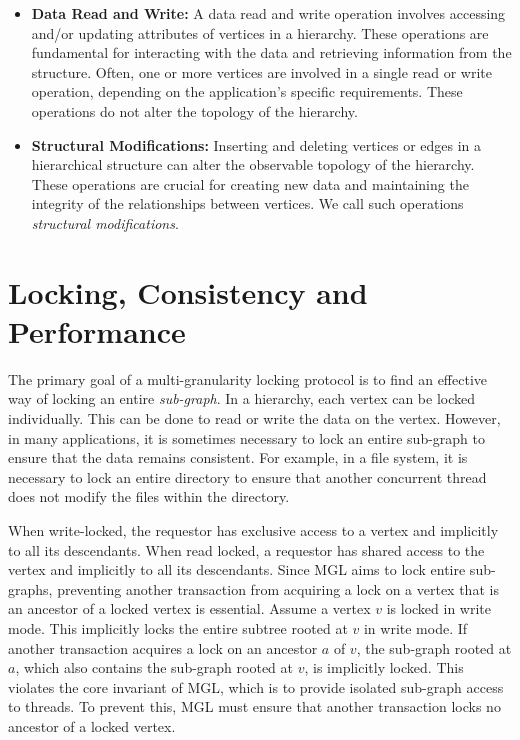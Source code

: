 \begin{itemize}

    
    \item \textbf{Data Read and Write:} A data read and write operation involves accessing and/or updating attributes of vertices in a hierarchy. These operations are fundamental for interacting with the data and retrieving information from the structure. Often, one or more vertices are involved in a single read or write operation, depending on the application's specific requirements. These operations do not alter the topology of the hierarchy.

    \item \textbf{Structural Modifications:} Inserting and deleting vertices or edges in a hierarchical structure can alter the observable topology of the hierarchy. These operations are crucial for creating new data and maintaining the integrity of the relationships between vertices. We call such operations \emph{structural modifications}.
    

\end{itemize}

\section{Locking, Consistency and Performance}
The primary goal of a multi-granularity locking protocol is to find an effective way of locking an entire \emph{sub-graph}. In a hierarchy, each vertex can be locked individually. This can be done to read or write the data on the vertex. However, in many applications, it is sometimes necessary to lock an entire sub-graph to ensure that the data remains consistent. For example, in a file system, it is necessary to lock an entire directory to ensure that another concurrent thread does not modify the files within the directory.


When write-locked, the requestor has exclusive access to a vertex and implicitly to all its descendants. When read locked, a requestor has shared access to the vertex and implicitly to all its descendants. Since MGL aims to lock entire sub-graphs, preventing another transaction from acquiring a lock on a vertex that is an ancestor of a locked vertex is essential. Assume a vertex $v$ is locked in write mode. This implicitly locks the entire subtree rooted at $v$ in write mode. If another transaction acquires a lock on an ancestor $a$ of $v$, the sub-graph rooted at $a$, which also contains the sub-graph rooted at $v$, is implicitly locked. This violates the core invariant of MGL, which is to provide isolated sub-graph access to threads. To prevent this, MGL must ensure that another transaction locks no ancestor of a locked vertex. 

